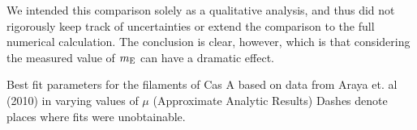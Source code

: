 \documentclass[iop, apj, numberedappendix, twocolappendix]{emulateapj}
\begin{document}
We intended this comparison solely as a qualitative analysis, and thus did not
rigorously keep track of uncertainties or extend the comparison to the full
numerical calculation. The conclusion is clear, however, which is that
considering the measured value of $m_{\rm E}$ can have a dramatic effect.

\begin{table}[h]
\tiny
\centering
\caption{Best fit parameters for the filaments of Cas A based on data from
Araya et. al (2010) in varying values of $\mu$ (Approximate Analytic Results)
Dashes denote places where fits were unobtainable.
\label{tab:araya}}

\end{table}



\end{document}
